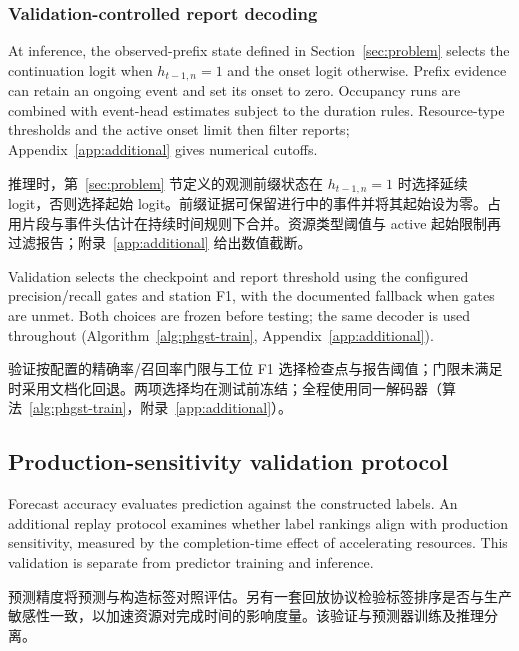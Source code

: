 \documentclass[a4paper,fleqn]{cas-dc}
\newcommand{\zhpara}[1]{%
  \par\begingroup\small\color{black!72}\noindent #1\par\endgroup}
\begin{document}
\subsubsection{Validation-controlled report decoding}

At inference, the observed-prefix state defined in Section~\ref{sec:problem} selects the continuation logit when $h_{t-1,n}=1$ and the onset logit otherwise. Prefix evidence can retain an ongoing event and set its onset to zero. Occupancy runs are combined with event-head estimates subject to the duration rules. Resource-type thresholds and the active onset limit then filter reports; Appendix~\ref{app:additional} gives numerical cutoffs.

\zhpara{推理时，第~\ref{sec:problem} 节定义的观测前缀状态在 $h_{t-1,n}=1$ 时选择延续 logit，否则选择起始 logit。前缀证据可保留进行中的事件并将其起始设为零。占用片段与事件头估计在持续时间规则下合并。资源类型阈值与 active 起始限制再过滤报告；附录~\ref{app:additional} 给出数值截断。}


Validation selects the checkpoint and report threshold using the configured precision/recall gates and station F1, with the documented fallback when gates are unmet. Both choices are frozen before testing; the same decoder is used throughout (Algorithm~\ref{alg:phgst-train}, Appendix~\ref{app:additional}).

\zhpara{验证按配置的精确率/召回率门限与工位 F1 选择检查点与报告阈值；门限未满足时采用文档化回退。两项选择均在测试前冻结；全程使用同一解码器（算法~\ref{alg:phgst-train}，附录~\ref{app:additional}）。}




\subsection{Production-sensitivity validation protocol}\label{sec:sensitivity-protocol}

Forecast accuracy evaluates prediction against the constructed labels. An additional replay protocol examines whether label rankings align with production sensitivity, measured by the completion-time effect of accelerating resources. This validation is separate from predictor training and inference.

\zhpara{预测精度将预测与构造标签对照评估。另有一套回放协议检验标签排序是否与生产敏感性一致，以加速资源对完成时间的影响度量。该验证与预测器训练及推理分离。}
\end{document}
